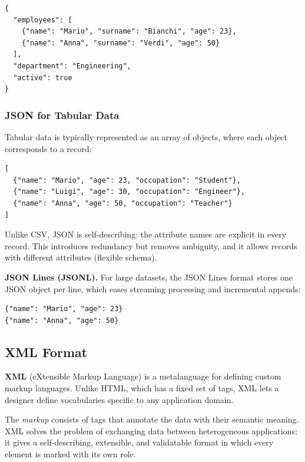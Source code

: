 \begin{lstlisting}[language={}, basicstyle=\ttfamily\scriptsize]
{
  "employees": [
    {"name": "Mario", "surname": "Bianchi", "age": 23},
    {"name": "Anna", "surname": "Verdi", "age": 50}
  ],
  "department": "Engineering",
  "active": true
}
\end{lstlisting}

\subsubsection{JSON for Tabular Data}
\label{subsec:json-tabular}

Tabular data is typically represented as an array of objects, where each object corresponds to a record:

\begin{lstlisting}[language={}, basicstyle=\ttfamily\scriptsize]
[
  {"name": "Mario", "age": 23, "occupation": "Student"},
  {"name": "Luigi", "age": 30, "occupation": "Engineer"},
  {"name": "Anna", "age": 50, "occupation": "Teacher"}
]
\end{lstlisting}

Unlike CSV, JSON is self-describing: the attribute names are explicit in every record. This introduces redundancy but removes ambiguity, and it allows records with different attributes (flexible schema).

\begin{notebox}
\textbf{JSON Lines (JSONL).}
For large datasets, the JSON Lines format stores one JSON object per line, which eases streaming processing and incremental appends:
\begin{lstlisting}[language={}, basicstyle=\ttfamily\tiny]
{"name": "Mario", "age": 23}
{"name": "Anna", "age": 50}
\end{lstlisting}
\end{notebox}

\subsection{XML Format}
\label{sec:xml-format}

\textbf{XML} (eXtensible Markup Language) is a metalanguage for defining custom markup languages. Unlike HTML, which has a fixed set of tags, XML lets a designer define vocabularies specific to any application domain.

The \textit{markup} consists of tags that annotate the data with their semantic meaning. XML solves the problem of exchanging data between heterogeneous applications: it gives a self-describing, extensible, and validatable format in which every element is marked with its own role.

